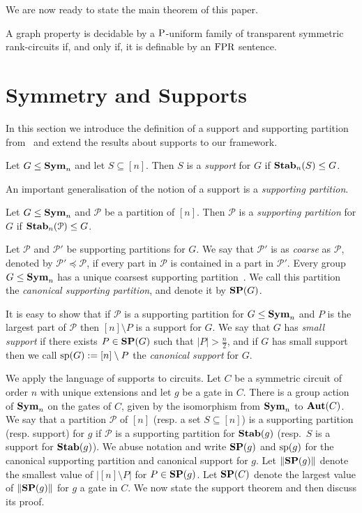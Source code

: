 \documentclass[a4paper,UKenglish]{lipics-v2018}
\begin{document}
We are now ready to state the main theorem of this paper.

\begin{theorem}
  A graph property is decidable by a $\mathrm{P}$-uniform family of transparent
  symmetric rank-circuits if, and only if, it is definable by an $\text{\upshape FPR}$
  sentence.
\end{theorem}


\section{Symmetry and Supports}
In this section we introduce the definition of a support and supporting
partition from~\cite{AndersonD17} and extend the results about supports to our
framework.

\begin{definition}
  Let $G \leq \text{\textbf{Sym}}_n$ and let $S \subseteq [n]$. Then $S$ is a \emph{support}
  for $G$ if $\text{\textbf{Stab}}_n(S) \leq G$.
\end{definition}

An important generalisation of the notion of a support is a \emph{supporting
  partition}.

\begin{definition}
  Let $G \leq \text{\textbf{Sym}}_n$ and $\mathcal{P}$ be a partition of $[n]$. Then
  $\mathcal{P}$ is a \emph{supporting partition} for $G$ if
  $\text{\textbf{Stab}}_n(\mathcal{P}) \leq G$.
\end{definition}

Let $\mathcal{P}$ and $\mathcal{P}'$ be supporting partitions for $G$. We say
that $\mathcal{P}'$ is as \emph{coarse} as $\mathcal{P}$, denoted by
$\mathcal{P}' \preceq \mathcal{P}$, if every part in $\mathcal{P}$ is contained
in a part in $\mathcal{P}'$. Every group $G \leq \text{\textbf{Sym}}_n$ has a unique coarsest
supporting partition~\cite{AndersonD17}. We call this partition the
\emph{canonical supporting partition}, and denote it by $\text{\textbf{SP}} (G)$.

It is easy to show that if $\mathcal{P}$ is a supporting partition for $G \leq
\text{\textbf{Sym}}_n$ and $P$ is the largest part of $\mathcal{P}$ then $[n] \setminus P$ is a
support for $G$. We say that $G$ has \emph{small support} if there exists $P \in
\text{\textbf{SP}}(G)$ such that $\vert P \vert > \frac{n}{2}$, and if $G$ has small support
then we call $\text{sp}(G) := [n] \setminus P$ the \emph{canonical support} for
$G$.

We apply the language of supports to circuits. Let $C$ be a symmetric circuit of
order $n$ with unique extensions and let $g$ be a gate in $C$. There is a group
action of $\text{\textbf{Sym}}_n$ on the gates of $C$, given by the isomorphism from $\text{\textbf{Sym}}_n$
to $\text{\textbf{Aut}}(C)$. We say that a partition $\mathcal{P}$ of $[n]$ (resp. a set $S
\subseteq [n]$) is a supporting partition (resp. support) for $g$ if
$\mathcal{P}$ is a supporting partition for $\text{\textbf{Stab}}(g)$ (resp.\ $S$ is a support
for $\text{\textbf{Stab}}(g)$). We abuse notation and write $\text{\textbf{SP}}(g)$ and $\text{sp}(g)$ for the
canonical supporting partition and canonical support for $g$. Let $\| \text{\textbf{SP}}(g) \|$
denote the smallest value of $\vert [n] \setminus P \vert$ for $P \in \text{\textbf{SP}}(g)$.
Let $\text{\textbf{SP}}(C)$ denote the largest value of $\| \text{\textbf{SP}}(g) \|$ for $g$ a gate in $C$.
We now state the support theorem and then discuss its proof.
\end{document}
